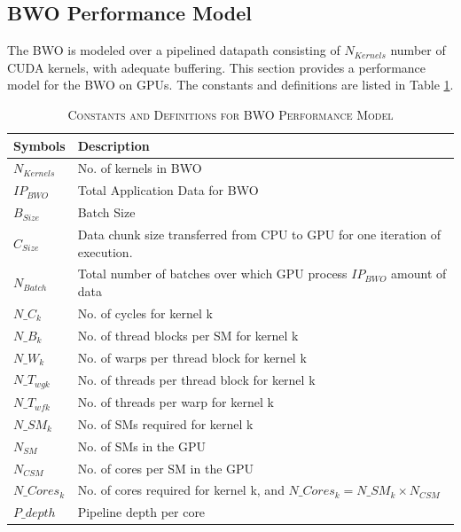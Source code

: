 \documentclass[conference]{IEEEtran}
\theoremstyle{definition}
\begin{document}
\subsection{BWO Performance Model}

The BWO is modeled over a pipelined datapath consisting of $N_{Kernels}$ number of CUDA kernels, with adequate buffering. This section provides a performance model for the BWO on GPUs. The constants and definitions are listed in Table \ref{table2}.

\begin{table}[!t]
\renewcommand{\arraystretch}{1.3}
\caption{\textsc{Constants and Definitions for BWO Performance Model}}
\label{table2}
\centering
\scalebox{0.8}
{
\begin{tabular}{| l | >{\arraybackslash}m{2.5in} |}
\hline
\textbf{Symbols} & \textbf{Description}\\
\hline
$N_{Kernels}$ & No. of kernels in BWO \\
\hline
$IP_{BWO}$ & Total Application Data for BWO \\
\hline
$B_{Size}$ & Batch Size \\
\hline
$C_{Size}$ & Data chunk size transferred from CPU to GPU for one iteration of execution. \\
\hline
$N_{Batch}$ & Total number of batches over which GPU process $IP_{BWO}$ amount of data \\
\hline
$N\_C_k$ & No. of cycles for kernel k\\
\hline
$N\_B_k$ & No. of thread blocks per SM for kernel k\\
\hline
$N\_W_k$ & No. of warps per thread block for kernel k\\
\hline
$N\_T_{wgk}$ & No. of threads per thread block for kernel k\\
\hline
$N\_T_{wfk}$ & No. of threads per warp for kernel k\\
\hline
$N\_SM_k$ & No. of SMs required for kernel k\\
\hline
$N_{SM}$ & No. of SMs in the GPU\\
\hline
$N_{CSM}$ & No. of cores per SM in the GPU\\
\hline
$N\_Cores_k$ & No. of cores required for kernel k, and $N\_Cores_k = N\_SM_k \times N_{CSM}$\\
\hline
$P\_depth$ & Pipeline depth per core\\

\end{tabular}}
\end{table}
\end{document}
